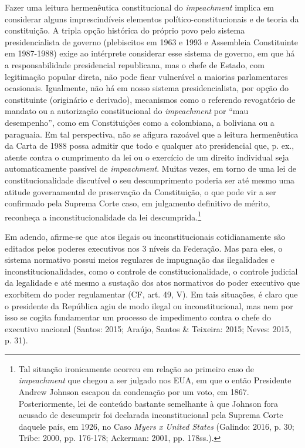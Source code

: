 Fazer uma leitura hermenêutica constitucional do \emph{impeachment}
implica em considerar alguns imprescindíveis elementos
político-constitucionais e de teoria da constituição. A tripla opção
histórica do próprio povo pelo sistema presidencialista de governo
(plebiscitos em 1963 e 1993 e Assembleia Constituinte em 1987-1988)
exige ao intérprete considerar esse sistema de governo, em que há a
responsabilidade presidencial republicana, mas o chefe de Estado, com
legitimação popular direta, não pode ficar vulnerável a maiorias
parlamentares ocasionais. Igualmente, não há em nosso sistema
presidencialista, por opção do constituinte (originário e derivado),
mecanismos como o referendo revogatório de mandato ou a autorização
constitucional do \emph{impeachment} por ``mau desempenho'', como em
Constituições como a colombiana, a boliviana ou a paraguaia. Em tal
perspectiva, não se afigura razoável que a leitura hermenêutica da Carta
de 1988 possa admitir que todo e qualquer ato presidencial que, p. ex.,
atente contra o cumprimento da lei ou o exercício de um direito
individual seja automaticamente passível de \emph{impeachment}. Muitas
vezes, em torno de uma lei de constitucionalidade discutível o seu
descumprimento poderia ser até mesmo uma atitude governamental de
preservação da Constituição, o que pode vir a ser confirmado pela
Suprema Corte caso, em julgamento definitivo de mérito, reconheça a
inconstitucionalidade da lei descumprida.\footnote{Tal situação
  ironicamente ocorreu em relação ao primeiro caso de \emph{impeachment}
  que chegou a ser julgado nos EUA, em que o então Presidente Andrew
  Johnson escapou da condenação por um voto, em 1867. Posteriormente,
  lei de conteúdo bastante semelhante à que Johnson fora acusado de
  descumprir foi declarada inconstitucional pela Suprema Corte daquele
  país, em 1926, no Caso \emph{Myers x United States} (Galindo: 2016, p.
  30; Tribe: 2000, pp. 176-178; Ackerman: 2001, pp. 178ss.).}

Em adendo, afirme-se que atos ilegais ou inconstitucionais
cotidianamente são editados pelos poderes executivos nos 3 níveis da
Federação. Mas para eles, o sistema normativo possui meios regulares de
impugnação das ilegalidades e inconstitucionalidades, como o controle de
constitucionalidade, o controle judicial da legalidade e até mesmo a
sustação dos atos normativos do poder executivo que exorbitem do poder
regulamentar (CF, art. 49, V). Em tais situações, é claro que o
presidente da República agiu de modo ilegal ou inconstitucional, mas nem
por isso se cogita fundamentar um processo de impedimento contra o chefe
do executivo nacional (Santos: 2015; Araújo, Santos \& Teixeira: 2015;
Neves: 2015, p. 31).

